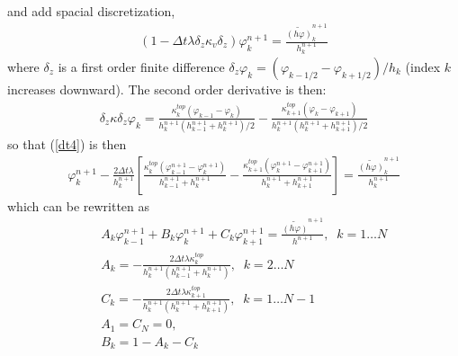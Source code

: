 \documentclass[11pt]{report}
\begin{document}
and add spacial discretization,
\begin{eqnarray}
\label{dt4}
\left(1- \Delta t \lambda \delta_z \kappa_v \delta_z \right)\varphi^{n+1}_k 
= \frac{\widetilde{(h\varphi)}^{n+1}_k}{h^{n+1}_k}
\end{eqnarray}
where $\delta_z$ is a first order finite difference $\delta_z \varphi_k= (\varphi_{k-1/2}-\varphi_{k+1/2})/h_k$ (index $k$ increases downward).  The second order derivative is then:
\begin{eqnarray}
\delta_z \kappa \delta_z \varphi_k= 
  \frac{\kappa_{k  }^{top}(\varphi_{k-1}-\varphi_{k  })}{h^{n+1}_k(h^{n+1}_{k-1} + h^{n+1}_{k  })/2}
- \frac{\kappa_{k+1}^{top}(\varphi_{k  }-\varphi_{k+1})}{h^{n+1}_k(h^{n+1}_{k  } + h^{n+1}_{k+1})/2}
\end{eqnarray}
so that (\ref{dt4}) is then
\begin{eqnarray}
\label{dt5}
\varphi^{n+1}_k 
- \frac{2 \Delta t \lambda}{h^{n+1}_k}\left[
  \frac{\kappa_{k  }^{top}(\varphi^{n+1}_{k-1}-\varphi^{n+1}_{k  })}{h^{n+1}_{k-1} + h^{n+1}_{k  }}
- \frac{\kappa_{k+1}^{top}(\varphi^{n+1}_{k  }-\varphi^{n+1}_{k+1})}{h^{n+1}_{k  } + h^{n+1}_{k+1}}
\right]
= \frac{\widetilde{(h\varphi)}^{n+1}_k}{h^{n+1}_k}
\end{eqnarray}
which can be rewritten as
\begin{eqnarray}
\label{tridiag}
&& A_{k}\varphi^{n+1}_{k-1} + B_k\varphi^{n+1}_k +  C_k\varphi^{n+1}_{k+1} 
=\frac{\widetilde{(h\varphi)}^{n+1}}{h^{n+1}}, \;\; k=1\ldots N\\
&& A_k = -\frac{2 \Delta t \lambda \kappa^{top}_{k}}{h_k^{n+1}(h_{k-1}^{n+1} + h_{k}^{n+1})}, \;\; k=2\ldots N \\
&& C_k = -\frac{2 \Delta t \lambda \kappa^{top}_{k+1}}{h_k^{n+1}(h_k^{n+1} + h_{k+1}^{n+1})}, \;\; k=1\ldots N-1 \\
&& A_1=C_N=0, \\
&& B_k = 1 - A_k - C_{k}
\end{eqnarray}
\end{document}
